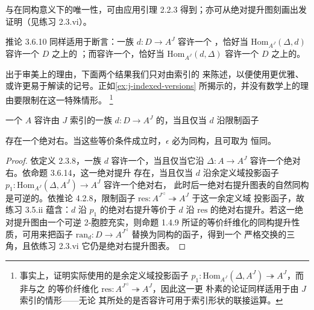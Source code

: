 \trLimit\trCone{}与\trColimit\trCone{}在同构意义下的唯一性，可由应用引理 2.2.3
得到；亦可从绝对提升图刻画出发证明（见练习 2.3.vi）。

\begin{remark}\label{rem:family-limit-terminal-element}
推论 3.6.10 同样适用于断言：一族\trDiagram{} $d\colon D\to A^{J}$ 容许一个%
\trLimit{}，恰好当 $\mathrm{Hom}_{A^{J}}(\Delta,d)$ 容许一个 $D$ 之上的%
\trTerminal{}\trElement{}；而容许一个\trColimit{}，恰好当
$\mathrm{Hom}_{A^{J}}(d,\Delta)$ 容许一个 $D$ 之上的\trInitial{}\trElement{}。
\end{remark}

出于审美上的理由，下面两个结果我们只对由\trSimplicialSet{}索引的\trDiagram{}%
来陈述，以便使用更优雅、或许更易于解读的记号。正如\cref{ex:j-indexed-versions}
所揭示的，并没有数学上的理由要限制在这一特殊情形。%
\footnote{事实上，证明实际使用的是余定义域投影函子
$p_{1}\colon\mathrm{Hom}_{A^{J}}(\Delta,A^{J})\twoheadrightarrow A^{J}$，而非与之%
\trEquivalence{}的等价纤维化
$\mathrm{res}\colon A^{J^{\triangleleft}}\twoheadrightarrow A^{J}$，因此这一更
朴素的论证同样适用于由\trInfinityCategory{} $J$ 索引\trDiagram{}的情形——无论
其所处的\trCartesianClosed{}\trInfinityCosmos{}是否容许可用于索引形状的联接运算。}

\begin{proposition}\label{prop:absolute-right-lifting-res}
一个\trInfinityCategory{} $A$ 容许由\trSimplicialSet{} $J$ 索引的一族\trDiagram{}
$d\colon D\to A^{J}$ 的\trLimit{}，当且仅当 $d$ 沿限制函子
\begin{center}
\end{center}
存在一个绝对右\trLifting{}。当这些等价条件成立时，$\epsilon$ 必为同构，且可取为
恒同。
\end{proposition}

\begin{proof}
依定义 2.3.8，一族\trDiagram{} $d$ 容许一个\trLimit{}，当且仅当它沿
$\Delta\colon A\to A^{J}$ 容许一个绝对右\trLifting{}。依命题 3.6.14，这一绝对提升
存在，当且仅当 $d$ 沿余定义域投影函子
$p_{1}\colon\mathrm{Hom}_{A^{J}}(\Delta,A^{J})\to A^{J}$ 容许一个绝对右\trLifting{}，
此时后一绝对右提升图表的自然同构是可逆的。依推论 4.2.8，限制函子
$\mathrm{res}\colon A^{J^{\triangleleft}}\twoheadrightarrow A^{J}$ \trEquivalence{}于这一余定义域
投影函子，故练习 3.5.ii 蕴含：$d$ 沿 $p_{1}$ 的绝对右提升等价于 $d$ 沿
$\mathrm{res}$ 的绝对右提升。若这一绝对提升图由一个可逆 2-胞腔充实，则命题 1.4.9
所证的等价纤维化的同构提升性质，可用来把函子
$\mathrm{ran}_{d}\colon D\to A^{J^{\triangleleft}}$ 替换为同构的函子，得到一个
严格交换的三角，且依练习 2.3.vi 它仍是绝对右提升图表。
\end{proof}

